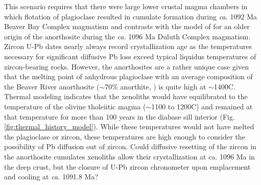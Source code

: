 \documentclass[draft]{agujournal2019}
\begin{document}
This scenario requires that there were large lower crustal magma chambers in which flotation of plagioclase resulted in cumulate formation during \textit{ca.} 1092 Ma Beaver Bay Complex magmatism and contrasts with the model of  for an older origin of the anorthosite during the \textit{ca.} 1096 Ma Duluth Complex magmatism. Zircon U-Pb dates nearly always record crystallization age as the temperatures necessary for significant diffusive Pb loss exceed typical liquidus temperatures of zircon-bearing rocks. However, the anorthosites are a rather unique case given that the melting point of anhydrous plagioclase with an average composition of the Beaver River anorthosite ($\sim$70$\%$ anorthite, ) is quite high at $\sim$1400\textdegree C. Thermal modeling indicates that the xenoliths would have equilibrated to the temperature of the olivine tholeiitic magma ($\sim$1100 to 1200\textdegree C) and remained at that temperature for more than 100 years in the diabase sill interior (Fig. \ref{fig:thermal_history_model}). While these temperatures would not have melted the plagioclase or zircon, these temperatures are high enough to consider the possibility of Pb diffusion out of zircon. Could diffusive resetting of the zircon in the anorthosite cumulates xenoliths allow their crystallization at ca. 1096 Ma in the deep crust, but the closure of U-Pb zircon chronometer upon emplacement and cooling at \textit{ca.} 1091.8 Ma?
\end{document}

